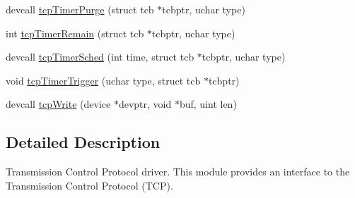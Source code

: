 \begin{DoxyCompactItemize}
devcall \hyperlink{group__tcp_ga6fee4e9c9633a74534e7a68cfa5e30fa}{tcp\-Timer\-Purge} (struct tcb $\ast$tcbptr, uchar type)
\item 
int \hyperlink{group__tcp_ga85db0509e89ad372e57a2e03cb87b95c}{tcp\-Timer\-Remain} (struct tcb $\ast$tcbptr, uchar type)
\item 
devcall \hyperlink{group__tcp_ga201c9b5969b80c388867c898b99a985b}{tcp\-Timer\-Sched} (int time, struct tcb $\ast$tcbptr, uchar type)
\item 
void \hyperlink{group__tcp_ga2e1f210796b029602528dd31c4b63a71}{tcp\-Timer\-Trigger} (uchar type, struct tcb $\ast$tcbptr)
\item 
devcall \hyperlink{group__tcp_gaadacb875ab044ec9478a2e50c07e0e47}{tcp\-Write} (device $\ast$devptr, void $\ast$buf, uint len)
\end{DoxyCompactItemize}


\subsection{Detailed Description}
Transmission Control Protocol driver. This module provides an interface to the Transmission Control Protocol (T\-C\-P). 

